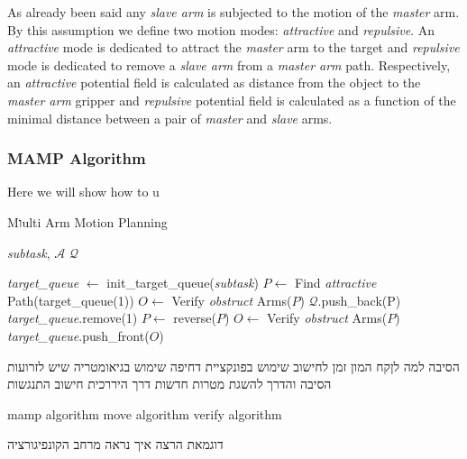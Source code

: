 \documentclass[english]{article}
\theoremstyle{definition}
\begin{document}
As already been said any \textit{slave arm} is subjected to the motion of the \textit{master} arm. By this assumption we define two motion modes: \textit{attractive} and \textit{repulsive}. An \textit{attractive} mode is dedicated to attract the \textit{master} arm to the target and \textit{repulsive} mode is dedicated to remove a \textit{slave arm} from a \textit{master arm} path. Respectively, an \textit{attractive} potential field is calculated as distance from the object to the \textit{master arm} gripper and \textit{repulsive} potential field is calculated as a function of the minimal distance between a pair of \textit{master} and \textit{slave} arms. 


\subsubsection*{MAMP Algorithm}
Here we will show how to u

\begin{algorithm}
\caption{Mוulti Arm Motion Planning} \label{alg:MAMP}
\begin{algorithmic}  [1] %
\Require \textit{subtask}, $\mathcal{A}$
\Ensure $\mathcal{Q}$

\State \textit{target\_queue} $\leftarrow$ init\_target\_queue(\textit{subtask})
	\State $P\leftarrow$ Find \textit{attractive} Path(target\_queue(1))
	\State $O\leftarrow$ Verify \textit{obstruct} Arms($P$)
		\State $\mathcal{Q}$.push\_back(P)
		\State \textit{target\_queue}.remove(1)
	\Else
		\State $P\leftarrow$ reverse($P$)
		\State $O\leftarrow$ Verify \textit{obstruct} Arms($P$)
		\State \textit{target\_queue}.push\_front($O$)
	\EndIf
\EndWhile

\end{algorithmic}
\end{algorithm}

הסיבה למה לןקח המון זמן לחישוב
שימוש בפונקציית דחיפה
שימוש בגיאומטריה שיש לזרועות
הסיבה והדרך להשגת מטרות חדשות
דרך היררכית
חישוב התנגשות

mamp algorithm
move algorithm
verify algorithm

דוגמאת הרצה
איך נראה מרחב הקונפיגורציה

\newpage


\newpage

\end{document}
